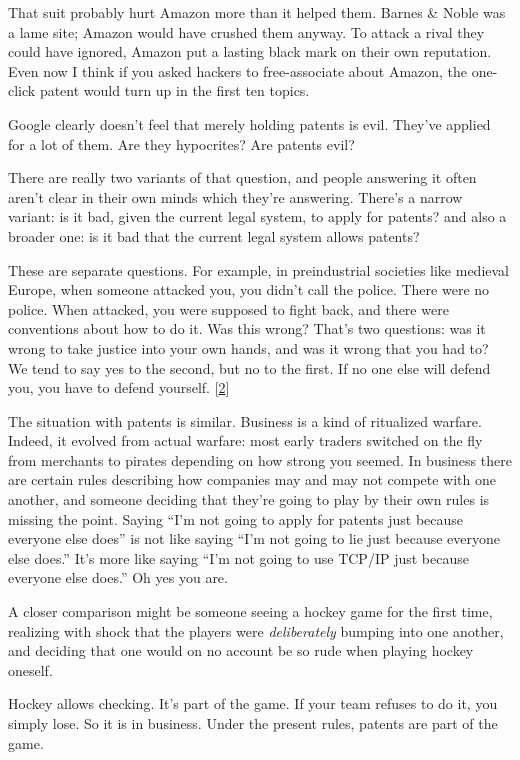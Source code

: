 That suit probably hurt Amazon more than it helped them. Barnes \& Noble
was a lame site; Amazon would have crushed them anyway. To attack a
rival they could have ignored, Amazon put a lasting black mark on their
own reputation. Even now I think if you asked hackers to free-associate
about Amazon, the one-click patent would turn up in the first ten
topics.

Google clearly doesn't feel that merely holding patents is evil. They've
applied for a lot of them. Are they hypocrites? Are patents evil?

There are really two variants of that question, and people answering it
often aren't clear in their own minds which they're answering. There's a
narrow variant: is it bad, given the current legal system, to apply for
patents? and also a broader one: is it bad that the current legal system
allows patents?

These are separate questions. For example, in preindustrial societies
like medieval Europe, when someone attacked you, you didn't call the
police. There were no police. When attacked, you were supposed to fight
back, and there were conventions about how to do it. Was this wrong?
That's two questions: was it wrong to take justice into your own hands,
and was it wrong that you had to? We tend to say yes to the second, but
no to the first. If no one else will defend you, you have to defend
yourself. {[}\hyperref[f2n]{2}{]}

The situation with patents is similar. Business is a kind of ritualized
warfare. Indeed, it evolved from actual warfare: most early traders
switched on the fly from merchants to pirates depending on how strong
you seemed. In business there are certain rules describing how companies
may and may not compete with one another, and someone deciding that
they're going to play by their own rules is missing the point. Saying
``I'm not going to apply for patents just because everyone else does''
is not like saying ``I'm not going to lie just because everyone else
does.'' It's more like saying ``I'm not going to use TCP/IP just because
everyone else does.'' Oh yes you are.

A closer comparison might be someone seeing a hockey game for the first
time, realizing with shock that the players were \emph{deliberately}
bumping into one another, and deciding that one would on no account be
so rude when playing hockey oneself.

Hockey allows checking. It's part of the game. If your team refuses to
do it, you simply lose. So it is in business. Under the present rules,
patents are part of the game.

